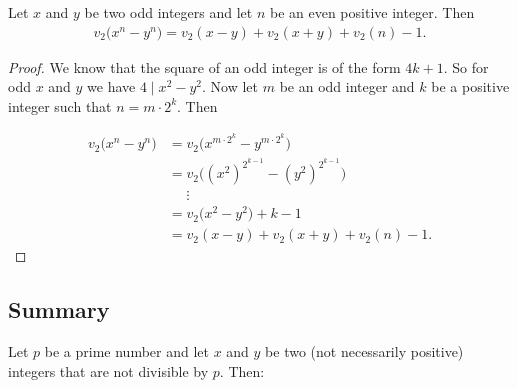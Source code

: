 \documentclass[main.tex]{subfile}
\begin{document}
    \begin{theorem}
        Let $x$ and $y$ be two odd integers and let $n$ be an even positive integer. Then
        \begin{align*}
        v_2\big(  x^n - y^n \big) = v_2(  x - y )+v_2(  x + y )+v_2(  n )-1.
        \end{align*}
    \end{theorem}

    \begin{proof}
        We know that the square of an odd integer is of the form $4k+1.$ So for odd $x$ and $y$ we have $4 \mid x^2-y^2.$ Now let $m$ be an odd integer and $k$ be a positive integer such that $n=m \cdot 2^k.$ Then
        
            \begin{align*}
                v_2 \big( x^{n} - y^{n} \big)  & = v_2\big( x^{m \cdot 2^{k}} - y^{m \cdot 2^{k}} \big)   \\
                & = v_2\big((x^2)^{2^{k-1}}-(y^2)^{2^{k-1}}\big) \\
                & \phantom{=} \vdots \\
                & =  v_2 \big( x^{2} - y^{2} \big) + k-1  \\
                & = v_2 ( x - y )+v_2 ( x + y )+v_2 ( n )-1. 
            \end{align*}
    \end{proof}

\subsection{Summary}

    Let $p$ be a prime number and let $x$ and $y$ be two (not necessarily positive) integers that are not divisible by $p.$ Then:
    
\end{document}
